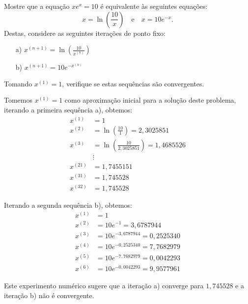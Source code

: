 \begin{Exercise}
  Mostre que a equação $xe^x = 10$ é equivalente às seguintes equações:
\begin{equation*}
  x=\ln\left(\frac{10}{x}\right)\quad\text{e}\quad x=10e^{-x}.
\end{equation*}
Destas, considere as seguintes iterações de ponto fixo:
\begin{enumerate}
 \item [a)] $\displaystyle x^{(n+1)}=\ln \left(\frac{10}{x^{(n)}}\right)$
 \item [b)] $\displaystyle x^{(n+1)}=10 e^{-x^{(n)}} $
\end{enumerate}
Tomando $x^{(1)} = 1$, verifique se estas sequências são convergentes.
\end{Exercise}
\begin{Answer}
  \begin{tiny}
Tomemos $x^{(1)}=1$ como aproximação inicial para a solução deste problema, iterando a primeira sequência a), obtemos:
\begin{align*}
x^{(1)} &=1\\
x^{(2)} &=\ln\left(\frac{10}{1}\right)=2,3025851\\
x^{(3)} &=\ln\left(\frac{10}{2,3025851}\right)=1,4685526\\
        &\vdots\\
x^{(21)}&= 1,7455151\\
x^{(31)}&= 1,745528\\
x^{(32)}&= 1,745528
\end{align*}

Iterando a segunda sequência b), obtemos:
\begin{align*}
x^{(1)}&=1\\
x^{(2)}&=10e^{-1}= 3,6787944   \\
x^{(3)}&=10e^{- 3,6787944 }= 0,2525340     \\
x^{(4)}&=10e^{-0,2525340}=  7,7682979      \\
x^{(5)}&=10e^{-7,7682979}=  0,0042293      \\
x^{(6)}&=10e^{-0,0042293}=  9,9577961
\end{align*}

Este experimento numérico sugere que a iteração a) converge para $1,745528$ e a iteração b) não é convergente.    
  \end{tiny}
\end{Answer}

